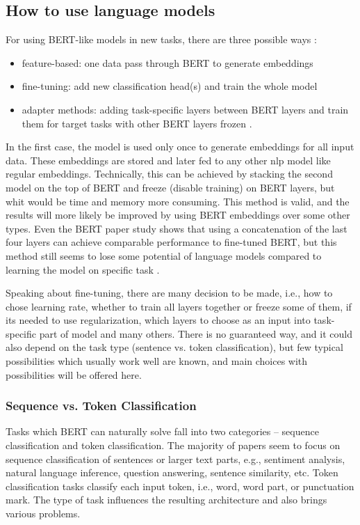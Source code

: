 \subsection{How to use language models}
 \label{sub:howto}
 For using BERT-like models in new tasks, there are three possible ways \citep{Liu2020}: 
 \begin{itemize}
 \item feature-based: one data pass through BERT to generate embeddings
 \item fine-tuning: add new classification head(s) and train the whole model
 \item adapter methods: adding task-specific layers between BERT layers and train them for target tasks with other BERT layers frozen \citep{Stickland2019}.
 \end{itemize}
In the first case, the model is used only once to generate embeddings for all input data. These embeddings are stored and later fed to any other \acrshort{nlp} model like regular embeddings. Technically, this can be achieved by stacking the second model on the top of BERT and freeze (disable training) on BERT layers, but whit would be time and memory more consuming. This method is valid, and the results will more likely be improved by using BERT embeddings over some other types. Even the BERT paper study shows that using a concatenation of the last four layers can achieve comparable performance to fine-tuned BERT, but this method still seems to lose some potential of language models compared to learning the model on specific task \citep{Sun}.
\par
Speaking about fine-tuning, there are many decision to be made, i.e., how to chose learning rate, whether to train all layers together or freeze some of them, if its needed to use regularization, which layers to choose as an input into task-specific part of model and many others. There is no guaranteed way, and it could also depend on the task type (sentence vs. token classification), but few typical possibilities which usually work well are known, and main choices with possibilities will be offered here.

\subsubsection{Sequence vs. Token Classification}
Tasks which BERT can naturally solve fall into two categories -- sequence classification and token classification. The majority of papers seem to focus on sequence classification of sentences or larger text parts, e.g., sentiment analysis, natural language inference, question answering, sentence similarity, etc. Token classification tasks classify each input token, i.e., word, word part, or punctuation mark. The type of task influences the resulting architecture and also brings various problems.
